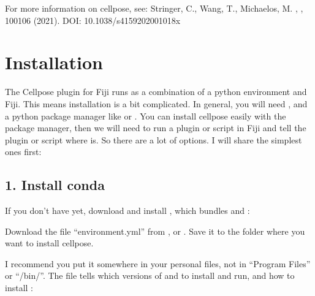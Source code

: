 \documentclass[letterpaper,10pt,english]{jupyterBook}
\begin{document}
\sphinxAtStartPar
For more information on cellpose, see: Stringer, C., Wang, T., Michaelos, M.  ,  , 100\sphinxhyphen{}106 (2021). DOI: 10.1038/s41592\sphinxhyphen{}020\sphinxhyphen{}01018\sphinxhyphen{}x


\section{Installation}
\label{\detokenize{cellpose:installation}}
\sphinxAtStartPar
The Cellpose plugin for Fiji runs as a combination of a python environment and Fiji. This means installation is a bit complicated. In general, you will need , and a python package manager like  or . You can install cellpose easily with the package manager, then we will need to run a plugin or script in Fiji and tell the plugin or script where  is. So there are a lot of options. I will share the simplest ones first:


\subsection{1. Install conda}
\label{\detokenize{cellpose:install-conda}}
\sphinxAtStartPar
If you don’t have  yet, download and install , which bundles  and :

\sphinxAtStartPar
{}

\sphinxAtStartPar
Download the file “environment.yml” from , or . Save it to the folder where you want to install cellpose.

\sphinxAtStartPar
I recommend you put it somewhere in your personal files, not in “Program Files” or “/bin/”. The  file tells  which versions of  and  to install and run, and how to install :
\end{document}
